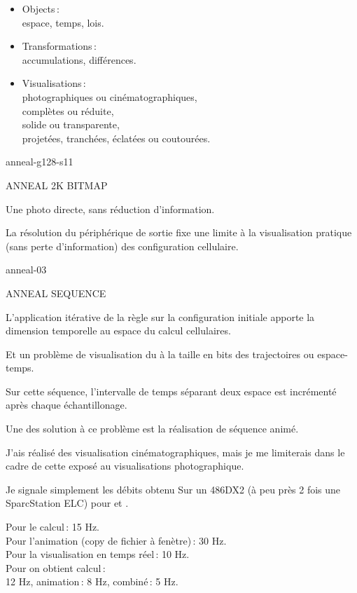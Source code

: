 \begin{slide}
  \begin{itemize}
    \item{Objects\,:}\\
      espace, temps, lois.
    \item{Transformations\,:}\\
      accumulations, diff\'erences.
    \item{Visualisations\,:}\\
      photographiques ou cin\'ematographiques, \\
      compl\`etes ou r\'eduite, \\
      solide ou transparente, \\
      projet\'ees, tranch\'ees, \'eclat\'ees ou coutour\'ees.
  \end{itemize}
\end{slide}

\begin{slide}
  {anneal-g128-s11}{  }
\end{slide}

\begin{mynote}
  ANNEAL 2K BITMAP

  Une photo directe, sans r\'eduction d'information.
  
  La r\'esolution du p\'eriph\'erique de sortie fixe une limite \`a la
  visualisation pratique (sans perte d'information) des configuration
  cellulaire.
\end{mynote}

%
{%
  {anneal-03}{  }}
{%
  ANNEAL SEQUENCE

  L'application it\'erative de la r\`egle sur la configuration initiale
  apporte la dimension temporelle au espace du calcul cellulaires.

  Et un probl\`eme de visualisation du \`a la taille en bits des
  trajectoires ou espace-temps.

  Sur cette s\'equence, l'intervalle de temps s\'eparant deux espace est
  incr\'ement\'e apr\`es chaque \'echantillonage.

  Une des solution \`a ce probl\`eme est la r\'ealisation de s\'equence anim\'e.

  J'ais r\'ealis\'e des visualisation cin\'ematographiques, mais je me
  limiterais dans le cadre de cette expos\'e au visualisations
  photographique.

  Je signale simplement les d\'ebits obtenu Sur un 486DX2 (\`a peu pr\`es 2
  fois une SparcStation ELC) pour  et .

  Pour le calcul\,: 15 Hz.\\
  Pour l'animation (copy de fichier \`a fen\`etre)\,: 30 Hz.\\
  Pour la visualisation en temps r\'eel\,: 10 Hz.\\
  Pour  on obtient calcul\,:\\
  12 Hz, animation\,: 8 Hz, combin\'e\,: 5 Hz.}

